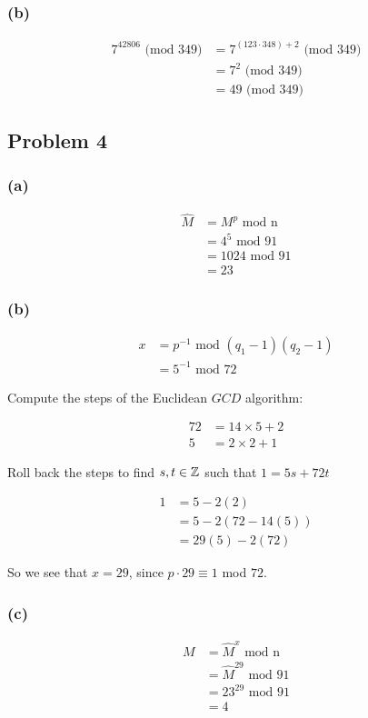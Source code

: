 \documentclass[10pt]{article}
\begin{document}
\subsubsection*{(b)}

\begin{align*}
  7^{42806} \text{ (mod 349)} &= 7^{(123 \cdot 348) + 2} \text{ (mod 349)} \\
    &= 7^2 \text{ (mod 349)} \\
    &= 49 \text{ (mod 349)}
\end{align*}

\newpage
\subsection*{Problem 4}

\subsubsection*{(a)}

\begin{align*}
  \hat{M} &= M^p \text{ mod n} \\
    &= 4^5 \text{ mod 91} \\
    &= 1024 \text{ mod 91} \\
    &= 23
\end{align*}

\subsubsection*{(b)}

\begin{align*}
  x &= p^{-1} \text{ mod $(q_{1} - 1)(q_{2} - 1)$} \\
    &= 5^{-1} \text{ mod 72}
\end{align*}

\spacing
\noindent
Compute the steps of the Euclidean $GCD$ algorithm:

\begin{align*}
  72 &= 14 \times 5 + 2 \\
  5 &= 2 \times 2 + 1
\end{align*}

\spacing
\noindent
Roll back the steps to find $s, t \in \mathbb{Z}$ such that $1 = 5s + 72t$

\begin{align*}
  1 &= 5 - 2(2) \\
    &= 5 - 2(72 - 14(5)) \\
    &= 29(5) - 2(72)
\end{align*}

\noindent
So we see that $x = 29$, since $p \cdot 29 \equiv 1$ mod $72$.

\subsubsection*{(c)}

\begin{align*}
  M &= \hat{M}^x \text{ mod n} \\
    &= \hat{M}^{29} \text{ mod 91} \\
    &= 23^{29} \text{ mod 91} \\
    &= 4
\end{align*}
\end{document}
